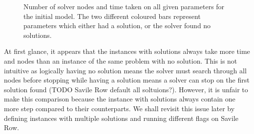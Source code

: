 \documentclass{article}
\begin{document}
\begin{figure}[H]
\caption{Number of solver nodes and time taken on all given parameters for the initial model. The two different coloured bars represent parameters which either had a solution, or the solver found no solutions.}
\end{figure}

\noindent
At first glance, it appears that the instances with solutions always take more time and nodes than an instance of the same problem with no solution. This is not intuitive as logically having no solution means the solver must search through all nodes before stopping while having a solution means a solver can stop on the first solution found (TODO Savile Row default all soltuions?). However, it is unfair to make this comparison because the instance with solutions always contain one more step compared to their counterparts. We shall revisit this issue later by defining instances with multiple solutions and running different flags on Savile Row. 
\end{document}
